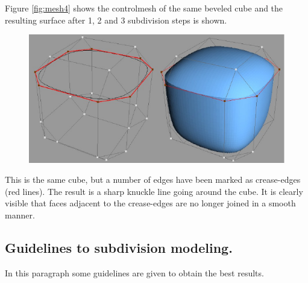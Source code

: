 \documentclass[12pt]{article}
\begin{document}
Figure \ref{fig:mesh4} shows the controlmesh of the same beveled cube
and the resulting surface after 1, 2 and 3 subdivision steps is shown.

\begin{figure}[h]
        \centering
        \includegraphics[width=15cm,natwidth=535,natheight=268]{figure6.png}
        \caption{}
        \label{fig:mesh5}
\end{figure}

This is the same cube, but a number of edges have been marked as
crease-edges (red lines). The result is a sharp knuckle line going
around the cube. It is clearly visible that faces adjacent to the
crease-edges are no longer joined in a smooth manner.
\pagebreak

\subsection{Guidelines to subdivision modeling.} \label{guidelines}
In this paragraph some guidelines are given to obtain the best
results.
\end{document}
